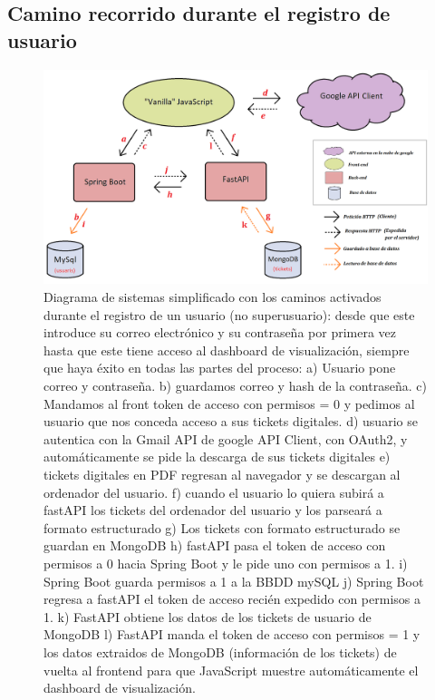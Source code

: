 \documentclass[a4paper,12pt]{report}
\begin{document}
				
			\subsection{Camino recorrido durante el registro de usuario}
				
				
				\setlength{\belowcaptionskip}{3pt}
				\FloatBarrier
				\begin{figure}[H]
					\centering
					\includegraphics[width=1\textwidth]{img/diagramaSistemesAplicacioMercappCAMIREGISTREbo.png}
					\caption{Diagrama de sistemas simplificado con los caminos activados durante el registro de un usuario (no superusuario): desde que este introduce su correo electrónico y su contraseña por primera vez hasta que este tiene acceso al dashboard de visualización, siempre que haya éxito en todas las partes del proceso: a) Usuario pone correo y contraseña. b) guardamos correo y hash de la contraseña. c) Mandamos al front token de acceso con permisos = 0 y pedimos al usuario que nos conceda acceso a sus tickets digitales. d) usuario se autentica con la Gmail API de google API Client, con OAuth2, y automáticamente se pide la descarga de sus tickets digitales e) tickets digitales en PDF regresan al navegador y se descargan al ordenador del usuario. f) cuando el usuario lo quiera subirá a fastAPI los tickets del ordenador del usuario y los parseará a formato estructurado g) Los tickets con formato estructurado se guardan en MongoDB h) fastAPI pasa el token de acceso con permisos a 0 hacia Spring Boot y le pide uno con permisos a 1. i) Spring Boot guarda permisos a 1 a la BBDD mySQL j) Spring Boot regresa a fastAPI el token de acceso recién expedido con permisos a 1. k) FastAPI obtiene los datos de los tickets de usuario de MongoDB l) FastAPI manda el token de acceso con permisos = 1 y los datos extraidos de MongoDB (información de los tickets) de vuelta al frontend para que JavaScript muestre automáticamente el dashboard de visualización.}
					\label{fig:diagramaSistemesAplicacioMercappCAMIREGISTRE} 
				\end{figure}
				\FloatBarrier
				
\end{document}
